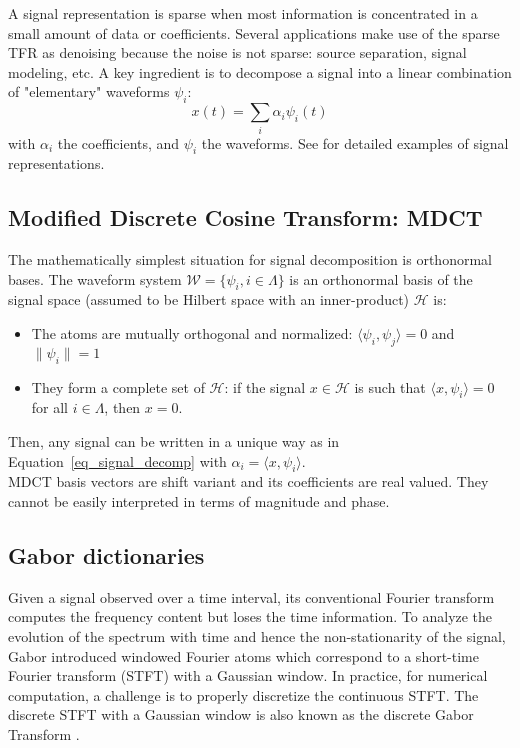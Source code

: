 A signal representation is sparse when most information is concentrated in a small amount of data or coefficients. Several applications make use of the sparse TFR as denoising because the noise is not sparse: source separation, signal modeling, etc. A key ingredient is to decompose a signal into a linear combination of "elementary" waveforms $\psi_{i}$:
\begin{equation}\label{eq_signal_decomp}
x(t) = \sum_i\alpha_i\psi_i(t)
\end{equation}
with $\alpha_i$ the coefficients, and $\psi_i$ the waveforms. See \cite{mallat2008wavelet,hlawatsch1992linear,wickerhauser1994adapted} for detailed examples of signal representations.\\

\subsection{Modified Discrete Cosine Transform: MDCT}
The mathematically simplest situation for signal decomposition is orthonormal bases. The waveform system $\mathcal{W}=\{\psi_i, i \in\Lambda\}$ is an orthonormal basis of the signal space (assumed to be Hilbert space with an inner-product) $\mathcal{H}$ is:
\begin{itemize}
\item The atoms are mutually orthogonal and normalized: $\langle\psi_i,\psi_j\rangle = 0$ and $\|\psi_i\|=1$
\item They form a complete set of $\mathcal{H}$: if the signal $x\in\mathcal{H}$ is such that $\langle x,\psi_i\rangle=0$ for all $i\in\Lambda$, then $x=0$.
\end{itemize}
Then, any signal can be written in a unique way as in Equation~\eqref{eq_signal_decomp} with $\alpha_i=\langle x,\psi_i\rangle$.\\

MDCT basis vectors are shift variant and its coefficients are real valued. They cannot be easily interpreted in terms of magnitude and phase.

\subsection{Gabor dictionaries}
Given a signal observed over a time interval, its conventional Fourier transform computes the frequency content but loses the time information. To analyze the evolution of the spectrum with time and hence the non-stationarity of the signal, Gabor introduced windowed Fourier atoms which correspond to a short-time Fourier transform (STFT) with a Gaussian window. In practice, for numerical computation, a challenge is to properly discretize the continuous STFT. The discrete STFT with a Gaussian window is also known as the discrete Gabor Transform \cite{gabor1946theory}.


